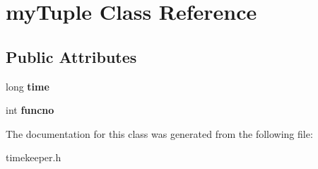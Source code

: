 \hypertarget{classmyTuple}{\section{my\-Tuple \-Class \-Reference}
\label{classmyTuple}
}
\subsection*{\-Public \-Attributes}
\begin{DoxyCompactItemize}
\item 
\hypertarget{classmyTuple_a68bfbc13eedd517b94a791737ee3b1c7}{long {\bfseries time}}\label{classmyTuple_a68bfbc13eedd517b94a791737ee3b1c7}

\item 
\hypertarget{classmyTuple_aada59ab55bed942139a1d7f91135b6b3}{int {\bfseries funcno}}\label{classmyTuple_aada59ab55bed942139a1d7f91135b6b3}

\end{DoxyCompactItemize}


\-The documentation for this class was generated from the following file\-:\begin{DoxyCompactItemize}
\item 
timekeeper.\-h\end{DoxyCompactItemize}
